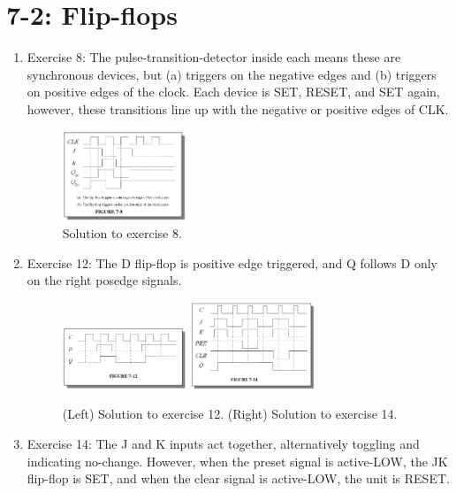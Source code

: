 \documentclass[10pt]{article}
\begin{document}
\section{7-2: Flip-flops}

\begin{enumerate}
\item Exercise 8: The pulse-transition-detector inside each means these are synchronous devices, but (a) triggers on the negative edges and (b) triggers on positive edges of the clock.  Each device is SET, RESET, and SET again, however, these transitions line up with the negative or positive edges of CLK.
\begin{figure}[ht]
\centering
\includegraphics[width=0.35\textwidth]{exercise8_ch7.png}
\caption{\label{fig:ex8} Solution to exercise 8.}
\end{figure}
\item Exercise 12: The D flip-flop is positive edge triggered, and Q follows D only on the right posedge signals.
\begin{figure}[ht]
\centering
\includegraphics[width=0.35\textwidth]{exercise12_ch7.png} \hspace{0.2cm}
\includegraphics[width=0.35\textwidth]{exercise14_ch7.png}
\caption{\label{fig:ex12} (Left) Solution to exercise 12. (Right) Solution to exercise 14.}
\end{figure}
\item Exercise 14: The J and K inputs act together, alternatively toggling and indicating no-change.  However, when the preset signal is active-LOW, the JK flip-flop is SET, and when the clear signal is active-LOW, the unit is RESET.
\end{enumerate}
\end{document}
